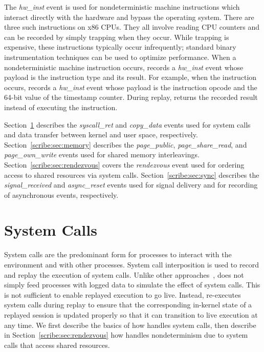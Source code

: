 \begin{table}[]
The {\em hw\_inst} event is used for nondeterministic machine
instructions which interact directly with the hardware and bypass the
operating system.  There are three such instructions on x86 CPUs.
They all involve reading CPU counters and can be recorded by simply
trapping when they occur.  While trapping is expensive, these
instructions typically occur infrequently; standard binary
instrumentation techniques can be used to optimize performance. 
When a nondeterministic machine instruction occurs, \scribe{} records
a {\em hw\_inst} event whose payload is the instruction type and
its result.  For example, when the  instruction occurs,
\scribe{} records a {\em hw\_inst} event whose payload is the
 instruction opcode and the 64-bit value of the timestamp
counter.  During replay, \scribe{} returns the recorded result
instead of executing the instruction.

Section~\ref{scribe:sec:syscalls} describes the {\em syscall\_ret} and {\em
  copy\_data} events used for system calls and data transfer between
kernel and user space,
respectively.
Section~\ref{scribe:sec:memory} describes the {\em page\_public}, {\em
  page\_share\_read}, and {\em page\_own\_write} events used for
shared memory interleavings.  Section~\ref{scribe:sec:rendezvous} covers
the {\em rendezvous} event used for ordering access to shared
resources via system calls. Section~\ref{scribe:sec:sync} describes the {\em
  signal\_received} and {\em async\_reset} events used for signal
delivery and for recording of asynchronous events, respectively.

 	
  

\section{System Calls}
\label{scribe:sec:syscalls}

System calls are the predominant form for processes to interact with
the environment and with other processes. System call interposition is
used to record and replay the execution of system calls.
Unlike other approaches~\cite{liblog,jockey,flashback}, \scribe{} does
not simply feed processes with logged data to simulate the effect of
system calls.  This is not sufficient to enable replayed execution to
go live.  Instead, \scribe{} re-executes system calls during replay to
ensure that the corresponding in-kernel state of a replayed session is
updated properly so that it can transition to live execution at any
time.  We first describe the basics of how \scribe{} handles system
calls, then describe in Section~\ref{scribe:sec:rendezvous} how \scribe{}
handles nondeterminism due to system calls that access shared
resources. 


\end{table}
